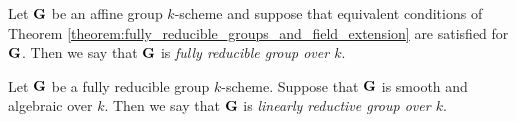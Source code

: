 \begin{definition}
Let $\mathbf{G}$ be an affine group $k$-scheme and suppose that equivalent conditions of Theorem \ref{theorem:fully_reducible_groups_and_field_extension} are satisfied for $\mathbf{G}$. Then we say that $\mathbf{G}$ is \textit{fully reducible group over $k$}.
\end{definition}

\begin{definition}
Let $\mathbf{G}$ be a fully reducible group $k$-scheme. Suppose that $\mathbf{G}$ is smooth and algebraic over $k$. Then we say that $\mathbf{G}$ is \textit{linearly reductive group over $k$}.
\end{definition}































































































\small







